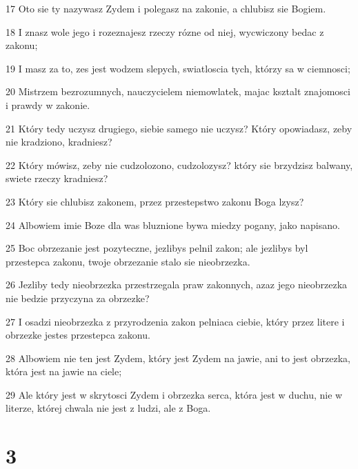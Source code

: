 \par 17 Oto sie ty nazywasz Zydem i polegasz na zakonie, a chlubisz sie Bogiem.
\par 18 I znasz wole jego i rozeznajesz rzeczy rózne od niej, wycwiczony bedac z zakonu;
\par 19 I masz za to, zes jest wodzem slepych, swiatloscia tych, którzy sa w ciemnosci;
\par 20 Mistrzem bezrozumnych, nauczycielem niemowlatek, majac ksztalt znajomosci i prawdy w zakonie.
\par 21 Który tedy uczysz drugiego, siebie samego nie uczysz? Który opowiadasz, zeby nie kradziono, kradniesz?
\par 22 Który mówisz, zeby nie cudzolozono, cudzolozysz? który sie brzydzisz balwany, swiete rzeczy kradniesz?
\par 23 Który sie chlubisz zakonem, przez przestepstwo zakonu Boga lzysz?
\par 24 Albowiem imie Boze dla was bluznione bywa miedzy pogany, jako napisano.
\par 25 Boc obrzezanie jest pozyteczne, jezlibys pelnil zakon; ale jezlibys byl przestepca zakonu, twoje obrzezanie stalo sie nieobrzezka.
\par 26 Jezliby tedy nieobrzezka przestrzegala praw zakonnych, azaz jego nieobrzezka nie bedzie przyczyna za obrzezke?
\par 27 I osadzi nieobrzezka z przyrodzenia zakon pelniaca ciebie, który przez litere i obrzezke jestes przestepca zakonu.
\par 28 Albowiem nie ten jest Zydem, który jest Zydem na jawie, ani to jest obrzezka, która jest na jawie na ciele;
\par 29 Ale który jest w skrytosci Zydem i obrzezka serca, która jest w duchu, nie w literze, której chwala nie jest z ludzi, ale z Boga.

\chapter{3}

